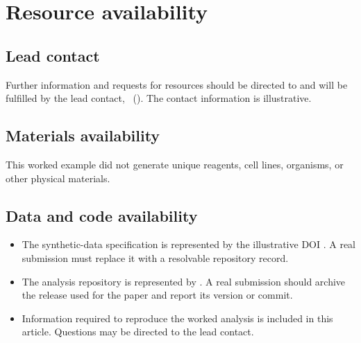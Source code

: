 \section{Resource availability}

\subsection{Lead contact}
Further information and requests for resources should be directed to and will be
fulfilled by the lead contact, \LeadContact\
(\href{mailto:\LeadEmail}{\LeadEmail}). The contact information is illustrative.

\subsection{Materials availability}
This worked example did not generate unique reagents, cell lines, organisms, or
other physical materials.

\subsection{Data and code availability}
\begin{itemize}[leftmargin=1.4em,itemsep=0.25em,topsep=0.25em]
  \item The synthetic-data specification is represented by the illustrative DOI
  \DataDOI. A real submission must replace it with a resolvable repository record.
  \item The analysis repository is represented by \CodeURL. A real submission
  should archive the release used for the paper and report its version or commit.
  \item Information required to reproduce the worked analysis is included in
  this article. Questions may be directed to the lead contact.
\end{itemize}
